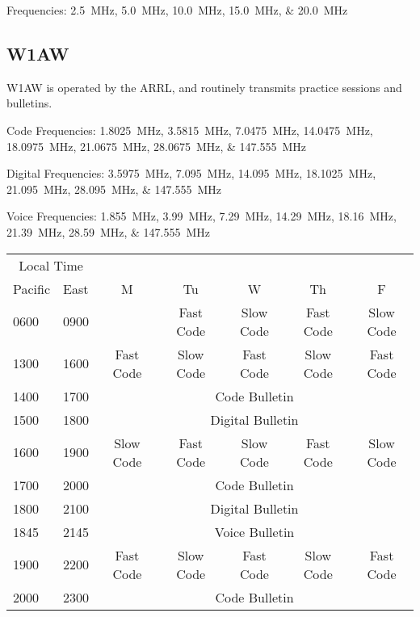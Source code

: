 \documentclass[11pt, onecolumn, table]{article}
\begin{document}
Frequencies: \SIlist{2.5;5.0;10.0;15.0;20.0}{\MHz}


\subsection{W1AW}
W1AW is operated by the ARRL, and routinely transmits practice sessions and bulletins.

Code Frequencies: \SIlist{1.8025;3.5815;7.0475;14.0475;18.0975;21.0675;28.0675;147.555}{\MHz}

Digital Frequencies: \SIlist{3.5975;7.095;14.095;18.1025;21.095;28.095;147.555}{\MHz}

Voice Frequencies: \SIlist{1.855;3.99;7.29;14.29;18.16;21.39;28.59;147.555}{\MHz}

\begin{table}[tbh]
  \begin{tabular}{l l c c c c c}
    \multicolumn{2}{c}{Local Time}	&			&			&			&			&			\\
    Pacific	&	East				& M			& Tu		& W			& Th		& F			\\
    \midrule
    0600	&	0900				&			& Fast Code	& Slow Code	& Fast Code	& Slow Code	\\
    1300	&	1600				& Fast Code	& Slow Code	& Fast Code	& Slow Code	& Fast Code	\\
    1400	&	1700				& \multicolumn{5}{c}{\cellcolor{gray!10}Code Bulletin}		\\
    1500	&	1800				& \multicolumn{5}{c}{\cellcolor{gray!10}Digital Bulletin}	\\
    1600	&	1900				& Slow Code	& Fast Code	& Slow Code	& Fast Code	& Slow Code	\\
    1700	&	2000				& \multicolumn{5}{c}{\cellcolor{gray!10}Code Bulletin}		\\
    1800	&	2100				& \multicolumn{5}{c}{\cellcolor{gray!10}Digital Bulletin}	\\
    1845	&	2145				& \multicolumn{5}{c}{\cellcolor{gray!10}Voice Bulletin}		\\
    1900	&	2200				& Fast Code	& Slow Code	& Fast Code	& Slow Code	& Fast Code	\\
    2000	&	2300				& \multicolumn{5}{c}{\cellcolor{gray!10}Code Bulletin}		\\
  \end{tabular}
\end{table}
\end{document}
